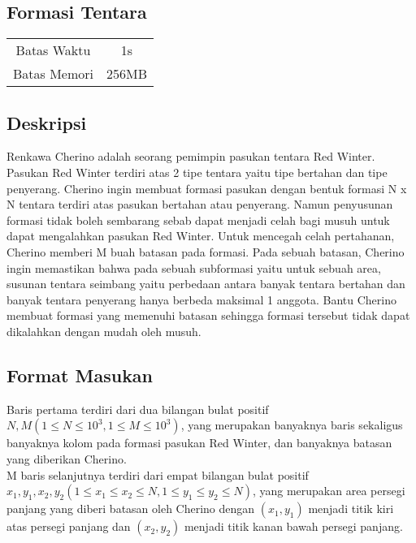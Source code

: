 \documentclass{article}
\begin{document}
\begin{center}

    
    \section*{Formasi Tentara} %

    \begin{tabular}{ | c c | }
        \hline
        Batas Waktu  & 1s \\    %
        Batas Memori & 256MB \\  %
        \hline
    \end{tabular}
\end{center}

\subsection*{Deskripsi}

Renkawa Cherino adalah seorang pemimpin pasukan tentara Red Winter. Pasukan Red Winter terdiri atas 2 tipe tentara yaitu tipe bertahan dan tipe penyerang. Cherino ingin membuat formasi pasukan dengan bentuk formasi N x N tentara terdiri atas pasukan bertahan atau penyerang. Namun penyusunan formasi tidak boleh sembarang sebab dapat menjadi celah bagi musuh untuk dapat mengalahkan pasukan Red Winter. Untuk mencegah celah pertahanan, Cherino memberi M buah batasan pada formasi. Pada sebuah batasan, Cherino ingin memastikan bahwa pada sebuah subformasi yaitu untuk sebuah area, susunan tentara seimbang yaitu perbedaan antara banyak tentara bertahan dan banyak tentara penyerang hanya berbeda maksimal 1 anggota. Bantu Cherino membuat formasi yang memenuhi batasan sehingga formasi tersebut tidak dapat dikalahkan dengan mudah oleh musuh.

\subsection*{Format Masukan}

Baris pertama terdiri dari dua bilangan bulat positif $N, M (1 \leq N \leq 10^3, 1 \leq M \leq 10^3)$, yang merupakan banyaknya baris sekaligus banyaknya kolom pada formasi pasukan Red Winter, dan banyaknya batasan yang diberikan Cherino.\\

M baris selanjutnya terdiri dari empat bilangan bulat positif $x_1, y_1, x_2, y_2 (1 \leq x_1 \leq x_2 \leq N, 1 \leq y_1 \leq y_2 \leq N)$, yang merupakan area persegi panjang yang diberi batasan oleh Cherino dengan $(x_1, y_1)$ menjadi titik kiri atas persegi panjang dan $(x_2, y_2)$ menjadi titik kanan bawah persegi panjang.
\end{document}
